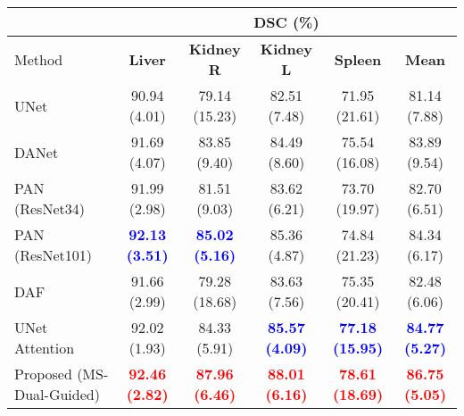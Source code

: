 \documentclass[journal]{IEEEtran}
\begin{document}
\begin{table*}[t!]
\centering
\scriptsize
\begin{tabular}{lcccc|c}\\
\toprule
 & \multicolumn{5}{c}{\textbf{DSC} (\%)}\\
 \midrule
Method & \textbf{Liver} & \textbf{Kidney R} & \textbf{Kidney L} & \textbf{Spleen} & \textbf{Mean}  \\
 \midrule
UNet \cite{ronneberger2015u}  & 90.94 (4.01)  & 79.14 (15.23) & 82.51 (7.48) & 71.95 (21.61) &  81.14 (7.88) \\
DANet \cite{fu2018dual}  & 91.69  (4.07) & 83.85 (9.40)& 84.49 (8.60) & 75.54 (16.08)&  83.89 (9.54)   \\
PAN (ResNet34) \cite{li2018pyramid}   & 91.99 (2.98)  & 81.51 (9.03) & 83.62 (6.21) & 73.70 (19.97) & 82.70 (6.51) \\
PAN (ResNet101)\cite{li2018pyramid}   & \textcolor{blue}{\textbf{92.13 (3.51)}}  & \textcolor{blue}{\textbf{85.02 (5.16)}} & 85.36 (4.87) & 74.84 (21.23) & 84.34 (6.17) \\
DAF \cite{wang18d}  &  91.66 (2.99) & 79.28 (18.68)& 83.63 (7.56) &  75.35 (20.41)&  82.48 (6.06)   \\
UNet Attention \cite{schlemper2019attention}  &   92.02 (1.93) & 84.33 (5.91)&  \textcolor{blue}{\textbf{85.57 (4.09)}} & \textcolor{blue}{\textbf{77.18 (15.95)}} &  \textcolor{blue}{\textbf{84.77 (5.27)}}   \\
Proposed (MS-Dual-Guided)  & \textcolor{red}{\textbf{92.46 (2.82)}}  & \textcolor{red}{\textbf{87.96 (6.46)}}& \textcolor{red}{\textbf{88.01 (6.16)}}  & \textcolor{red}{\textbf{78.61 (18.69)}} &  \textcolor{red}{\textbf{86.75 (5.05)}}\\


\end{tabular}
\end{table*}
\end{document}
